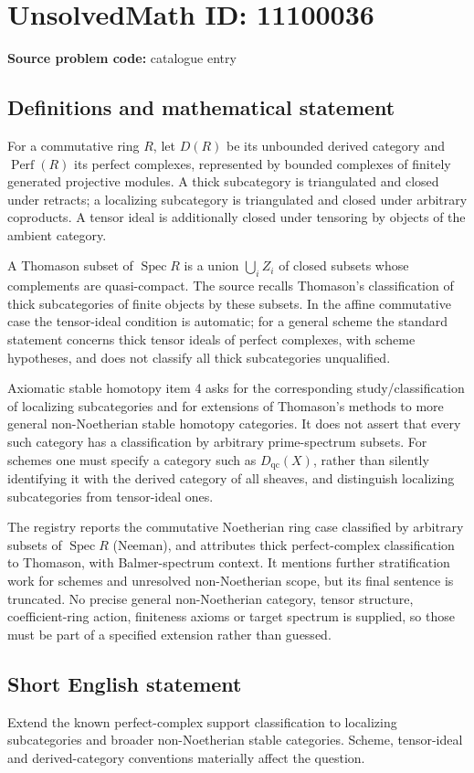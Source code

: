 \documentclass[11pt]{article}
\begin{document}
\section*{UnsolvedMath ID: 11100036}
\textbf{Source problem code:} catalogue entry
\subsection{Definitions and mathematical statement}
For a commutative ring $R$, let $D(R)$ be its unbounded derived category and $\operatorname{Perf}(R)$ its perfect complexes, represented by bounded complexes of finitely generated projective modules. A thick subcategory is triangulated and closed under retracts; a localizing subcategory is triangulated and closed under arbitrary coproducts. A tensor ideal is additionally closed under tensoring by objects of the ambient category.

A Thomason subset of $\operatorname{Spec}R$ is a union $\bigcup_i Z_i$ of closed subsets whose complements are quasi-compact. The source recalls Thomason's classification of thick subcategories of finite objects by these subsets. In the affine commutative case the tensor-ideal condition is automatic; for a general scheme the standard statement concerns thick tensor ideals of perfect complexes, with scheme hypotheses, and does not classify all thick subcategories unqualified.

Axiomatic stable homotopy item 4 asks for the corresponding study/classification of localizing subcategories and for extensions of Thomason's methods to more general non-Noetherian stable homotopy categories. It does not assert that every such category has a classification by arbitrary prime-spectrum subsets. For schemes one must specify a category such as $D_{\mathrm{qc}}(X)$, rather than silently identifying it with the derived category of all sheaves, and distinguish localizing subcategories from tensor-ideal ones.

The registry reports the commutative Noetherian ring case classified by arbitrary subsets of $\operatorname{Spec}R$ (Neeman), and attributes thick perfect-complex classification to Thomason, with Balmer-spectrum context. It mentions further stratification work for schemes and unresolved non-Noetherian scope, but its final sentence is truncated. No precise general non-Noetherian category, tensor structure, coefficient-ring action, finiteness axioms or target spectrum is supplied, so those must be part of a specified extension rather than guessed.
\subsection{Short English statement}
Extend the known perfect-complex support classification to localizing subcategories and broader non-Noetherian stable categories. Scheme, tensor-ideal and derived-category conventions materially affect the question.
\end{document}
